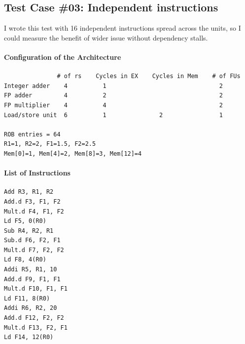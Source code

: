 \documentclass[11pt]{article}
\renewcommand{\_}{\origunderscore\allowbreak}
\begin{document}
\subsection{Test Case \#03: Independent instructions}

I wrote this test with 16 independent instructions spread across the units, so I could measure
the benefit of wider issue without dependency stalls.

\paragraph{Configuration of the Architecture}
\begin{verbatim}
               # of rs    Cycles in EX    Cycles in Mem    # of FUs
Integer adder    4          1                                2
FP adder         4          2                                2
FP multiplier    4          4                                2
Load/store unit  6          1               2                1

ROB entries = 64
R1=1, R2=2, F1=1.5, F2=2.5
Mem[0]=1, Mem[4]=2, Mem[8]=3, Mem[12]=4
\end{verbatim}

\paragraph{List of Instructions}
\begin{verbatim}
Add R3, R1, R2
Add.d F3, F1, F2
Mult.d F4, F1, F2
Ld F5, 0(R0)
Sub R4, R2, R1
Sub.d F6, F2, F1
Mult.d F7, F2, F2
Ld F8, 4(R0)
Addi R5, R1, 10
Add.d F9, F1, F1
Mult.d F10, F1, F1
Ld F11, 8(R0)
Addi R6, R2, 20
Add.d F12, F2, F2
Mult.d F13, F2, F1
Ld F14, 12(R0)
\end{verbatim}
\end{document}
